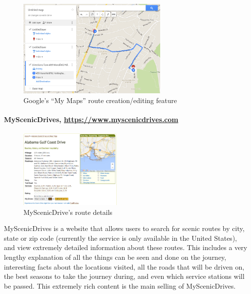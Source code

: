 \begin{figure}[!ht]
	\begin{center}
		\includegraphics[width=0.66\textwidth]{images/background/gm_rcp.png}
	\end{center}
	\vspace{-6mm}
	\caption{Google's ``My Maps'' route creation/editing feature}
	\vspace{-6mm}
\end{figure}

\newpage 
\paragraph{MyScenicDrives, \url{https://www.myscenicdrives.com}}
\begin{figure}
	\vspace{1mm}
	\begin{center}
		\hspace{5mm}
		\includegraphics[width=0.45\textwidth]{images/background/msd_rdp.png}
	\end{center}
	\vspace{-6mm}
	\caption{MyScenicDrive's route details}	
	\vspace{-10mm}
\end{figure}
MyScenicDrives is a website that allows users to search for scenic routes by city, state or zip code (currently the service is only available in the United States), and view extremely detailed information about these routes. This includes a very lengthy explanation of all the things can be seen and done on the journey, interesting facts about the locations visited, all the roads that will be driven on, the best seasons to take the journey during, and even which service stations will be passed. This extremely rich content is the main selling of MyScenicDrives.

